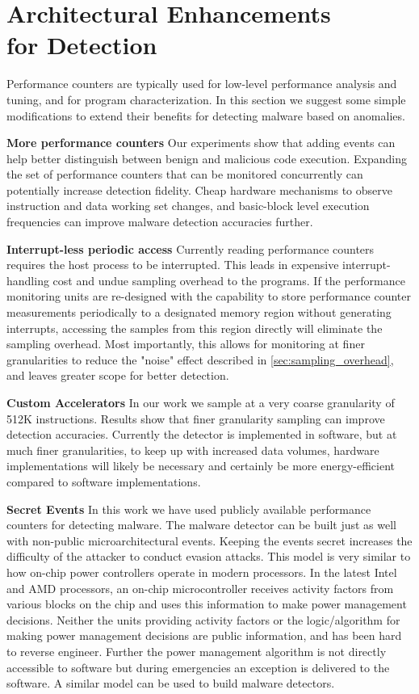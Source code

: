 \documentclass{acm_proc_article-sp}
\begin{document}
\section{Architectural Enhancements \\for Detection}
\label{sec:arch}

Performance counters are typically used for low-level performance
analysis and tuning, and for program characterization. In this
section we suggest some simple modifications to extend their benefits
for detecting malware based on anomalies.

\textbf{More performance counters} \space\space Our experiments show that
adding events can help better distinguish between benign and malicious
code execution. Expanding the set of performance counters that can
be monitored concurrently can potentially increase detection fidelity.
Cheap hardware mechanisms to observe instruction and data working
set changes, and basic-block level execution frequencies can improve
malware detection accuracies further.

\textbf{Interrupt-less periodic access} \space\space Currently reading
performance counters requires the host process to be interrupted.
This leads in expensive interrupt-handling cost and undue sampling
overhead to the programs. If the performance monitoring units are
re-designed with the capability to store performance counter
measurements periodically to a designated memory region without
generating interrupts, accessing the samples from this region
directly will eliminate the sampling overhead. Most importantly,
this allows for monitoring at finer granularities to reduce the
"noise" effect described in \ref{sec:sampling_overhead}, and leaves
greater scope for better detection.

\textbf{Custom Accelerators} \space\space In our work we sample at a very
coarse granularity of 512K instructions. Results show that finer
granularity sampling can improve detection accuracies. Currently
the detector is implemented in software, but at much finer
granularities, to keep up with increased data volumes, hardware
implementations will likely be necessary and certainly be more
energy-efficient compared to software implementations.

\textbf{Secret Events} \space\space In this work we have used publicly available
performance counters for detecting malware. The malware detector
can be built just as well with non-public microarchitectural events.
Keeping the events secret increases the difficulty of the attacker
to conduct evasion attacks.  This model is very similar to how
on-chip power controllers operate in modern processors.  In the
latest Intel and AMD processors, an on-chip microcontroller receives
activity factors from various blocks on the chip and uses this
information to make power management
decisions.
Neither the units providing activity factors or the logic/algorithm
for making power management decisions are public information, and
has been hard to reverse engineer.  Further the power management
algorithm is not directly accessible to software but during emergencies
an exception is delivered to the software. A similar model can be
used to build malware detectors.
\end{document}
